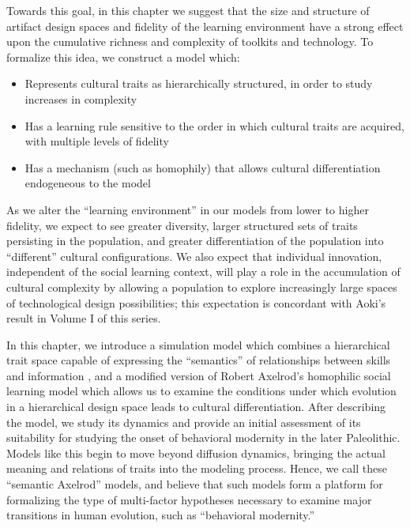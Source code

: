 \documentclass[referee,graybox,natbib]{svmult}
\begin{document}
Towards this goal, in this chapter we suggest that the size and
structure of artifact design spaces and fidelity of the learning
environment have a strong effect upon the cumulative richness and
complexity of toolkits and technology. To formalize this idea, we
construct a model which:

\begin{itemize}
\itemsep1pt\parskip0pt
\item
  Represents cultural traits as hierarchically structured, in order to
  study increases in complexity
\item
  Has a learning rule sensitive to the order in which cultural traits
  are acquired, with multiple levels of fidelity
\item
  Has a mechanism (such as homophily) that allows cultural
  differentiation endogeneous to the model
\end{itemize}

As we alter the ``learning environment'' in our models from lower to
higher fidelity, we expect to see greater diversity, larger structured
sets of traits persisting in the population, and greater differentiation
of the population into ``different'' cultural configurations. We also
expect that individual innovation, independent of the social learning
context, will play a role in the accumulation of cultural complexity by
allowing a population to explore increasingly large spaces of
technological design possibilities; this expectation is concordant with
Aoki's \citeyearpar{Aoki2013Determinants-of} result in Volume I of this
series.

In this chapter, we introduce a simulation model which combines a
hierarchical trait space capable of expressing the ``semantics'' of
relationships between skills and information \citep{Mesoudi2008a}, and a
modified version of Robert Axelrod's \citeyearpar{axelrod1997}
homophilic social learning model which allows us to examine the
conditions under which evolution in a hierarchical design space leads to
cultural differentiation. After describing the model, we study its
dynamics and provide an initial assessment of its suitability for
studying the onset of behavioral modernity in the later Paleolithic.
Models like this begin to move beyond diffusion dynamics, bringing the
actual meaning and relations of traits into the modeling process. Hence,
we call these ``semantic Axelrod'' models, and believe that such models
form a platform for formalizing the type of multi-factor hypotheses
necessary to examine major transitions in human evolution, such as
``behavioral modernity.''
\end{document}
